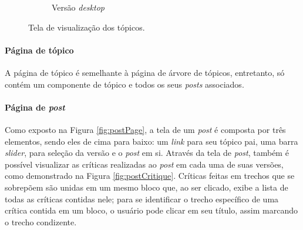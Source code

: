 \begin{figure}[hbt!]
\begin{subfigure}{.7\textwidth}
  \caption{Versão \textit{desktop}}
\end{subfigure}
\caption{Tela de visualização dos tópicos.}
\label{fig:topicTree}
\end{figure}



\paragraph{Página de tópico}
A página de tópico é semelhante à página de árvore de tópicos, entretanto, só contém um componente de tópico e todos os seus \textit{posts} associados.


\paragraph{Página de \textit{post}}

Como exposto na Figura \ref{fig:postPage}, a tela de um \textit{post} é composta por três elementos, sendo eles de cima para baixo: um \textit{link} para seu tópico pai, uma barra \textit{slider}, para seleção da versão e o \textit{post} em si. Através da tela de \textit{post}, também é possível visualizar as críticas realizadas ao \textit{post} em cada uma de suas versões, como demonstrado na Figura \ref{fig:postCritique}. Críticas feitas em trechos que se sobrepõem são unidas em um mesmo bloco que, ao ser clicado, exibe a lista de todas as críticas contidas nele; para se identificar o trecho específico de uma crítica contida em um bloco, o usuário pode clicar em seu título, assim marcando o trecho condizente.


